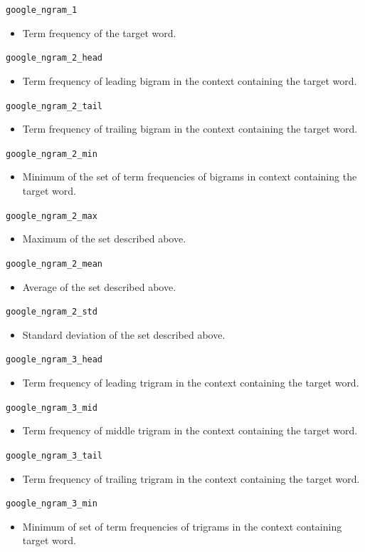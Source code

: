 \documentclass[11pt,a4paper]{article}
\begin{document}
\texttt{google\_ngram\_1}
\begin{itemize}
  \item Term frequency of the target word.
\end{itemize}
\texttt{google\_ngram\_2\_head}
\begin{itemize}
  \item Term frequency of leading bigram in the context containing the target word.
\end{itemize}
\texttt{google\_ngram\_2\_tail}
\begin{itemize}
  \item Term frequency of trailing bigram in the context containing the target word.
\end{itemize}
\texttt{google\_ngram\_2\_min}
\begin{itemize}
  \item Minimum of the set of term frequencies of bigrams in context containing the target word.
\end{itemize}
\texttt{google\_ngram\_2\_max}
\begin{itemize}
  \item Maximum of the set described above.
\end{itemize}
\texttt{google\_ngram\_2\_mean}
\begin{itemize}
  \item Average of the set described above.
\end{itemize}
\texttt{google\_ngram\_2\_std}
\begin{itemize}
  \item Standard deviation of the set described above.
\end{itemize}
\texttt{google\_ngram\_3\_head}
\begin{itemize}
  \item Term frequency of leading trigram in the context containing the target word.
\end{itemize}
\texttt{google\_ngram\_3\_mid}
\begin{itemize}
  \item Term frequency of middle trigram in the context containing the target word.
\end{itemize}
\texttt{google\_ngram\_3\_tail}
\begin{itemize}
  \item Term frequency of trailing trigram in the context containing the target word.
\end{itemize}
\texttt{google\_ngram\_3\_min}
\begin{itemize}
  \item Minimum of set of term frequencies of trigrams in the context containing target word.
\end{itemize}
\end{document}
